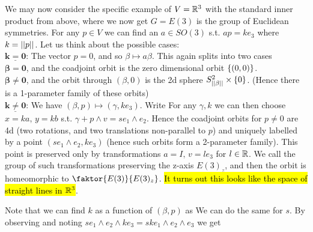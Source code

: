 \documentclass{article}
\begin{document}
\begin{example}
We may now consider the specific example of $V = \mathbb{R}^3$ with the standard inner product from above, where we now get $G= E(3)$ is the group of Euclidean symmetries. For any $p \in V$ we can find an $a \in SO(3)$ s.t. $ap = k e_3$ where $k = \left\lvert\left\lvert p \right\rvert\right\rvert$. Let us think about the possible cases:\\
\newline
$\underline{\bm{k=0}}$: The vector $p=0$, and so $\beta\mapsto a\beta$. This again splits into two cases\\
$\bm{\beta=0}$, and the coadjoint orbit is the zero dimensional orbit $\left\{ (0,0) \right\}$. \\
$\bm{\beta \neq 0}$, and the orbit through $(\beta,0)$ is the 2d sphere $S^2_{\left\lvert\left\lvert \beta \right\rvert\right\rvert}\times\left\{ 0 \right\}$. (Hence there is a 1-parameter family of these orbits) \\
\newline 
$\underline{\bm{k\neq0}}$: We have $(\beta,p) \mapsto (\gamma,ke_3)$. Write
For any $\gamma,k$ we can then choose $x=ka, \, y=kb$ s.t. $\gamma + p \wedge v = s e_1 \wedge e_2$. Hence the coadjoint orbits for $p \neq 0$ are 4d (two rotations, and two translations non-parallel to $p$) and uniquely labelled by a point $(se_1 \wedge e_2, ke_3)$ (hence such orbits form a 2-parameter family). This point is preserved only by transformations $a=I, \, v = le_3$ for $l \in \mathbb{R}$. We call the group of such transformations preserving the z-axis $E(3)_z$, and then the orbit is homeomorphic to $\faktor{E(3)}{E(3)_z}$. \hl{It turns out this looks like the space of straight lines in $\mathbb{R}^3$}. 
\begin{remark}
Note that we can find $k$ as a function of $(\beta,p)$ as
We can do the same for $s$. By observing 
and noting $se_1 \wedge e_2 \wedge ke_3 = sk e_1 \wedge e_2 \wedge e_3$ we get 
\eq{
}
\end{remark}
\end{example}
\end{document}
